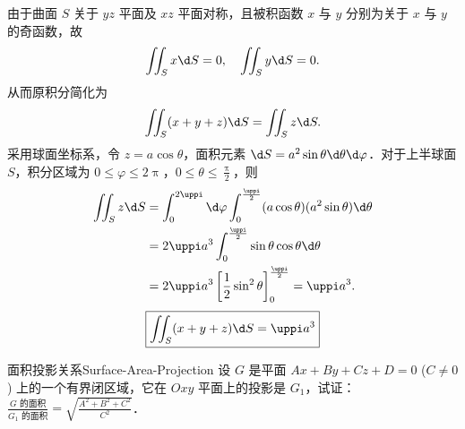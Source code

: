 \begin{solution}
    由于曲面 $S$ 关于 $yz$ 平面及 $xz$ 平面对称，且被积函数 $x$ 与 $y$ 分别为关于 $x$ 与 $y$ 的奇函数，故
    \begin{equation}
        \iint_{S} x \d S = 0, \quad \iint_{S} y \d S = 0.
    \end{equation}
    从而原积分简化为
    \begin{equation}
        \iint_{S} (x + y + z) \d S = \iint_{S} z \d S.
    \end{equation}
    采用球面坐标系，令 $z = a \cos \theta$，面积元素 $\d S = a^2 \sin \theta \d \theta \d \varphi$．对于上半球面 $S$，积分区域为 $0 \le \varphi \le 2\uppi$，$0 \le \theta \le \frac{\uppi}{2}$，则
    \begin{equation}
        \begin{aligned}
            \iint_{S} z \d S & = \int_{0}^{2\uppi} \d \varphi \int_{0}^{\frac{\uppi}{2}} (a \cos \theta) (a^2 \sin \theta) \d \theta \\
                             & = 2\uppi a^3 \int_{0}^{\frac{\uppi}{2}} \sin \theta \cos \theta \d \theta                             \\
                             & = 2\uppi a^3 \left[ \frac{1}{2} \sin^2 \theta \right]_{0}^{\frac{\uppi}{2}} = \uppi a^3.
        \end{aligned}
    \end{equation}
    \begin{equation}
        \boxed{\iint_{S} (x + y + z) \d S = \uppi a^3}
    \end{equation}
\end{solution}

\begin{problem}{面积投影关系}{Surface-Area-Projection}
    设 $G$ 是平面 $Ax + By + Cz + D = 0$ ($C \neq 0$) 上的一个有界闭区域，它在 $Oxy$ 平面上的投影是 $G_1$，试证：$\frac{G \text{ 的面积}}{G_1 \text{ 的面积}} = \sqrt{\frac{A^2 + B^2 + C^2}{C^2}}$．
\end{problem}

